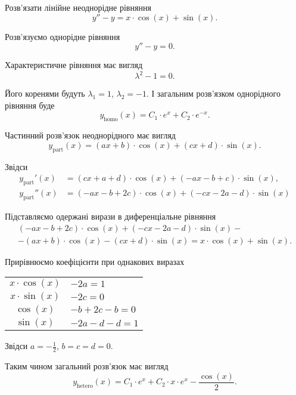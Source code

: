 \begin{example}
	Розв'язати лінійне неоднорідне рівняння \[ y'' - y = x \cdot \cos(x) + \sin (x).\]
\end{example}
\begin{solution}
	Розв'язуємо однорідне рівняння
	\begin{equation*}
		y'' - y = 0.
	\end{equation*}

	Характеристичне рівняння має вигляд
	\begin{equation*}
		\lambda^2 - 1 = 0.
	\end{equation*}

	Його коренями будуть $\lambda_1 = 1$, $\lambda_2 = -1$. І загальним роз\-в'яз\-ком однорідного рівняння буде
	\begin{equation*}
		y_{\text{homo}}(x) = C_1 \cdot e^x + C_2 \cdot e^{-x}.
	\end{equation*}

	Частинний розв'язок неоднорідного має вигляд
	\begin{equation*}
		y_{\text{part}}(x) = (a x + b) \cdot \cos (x) + (c x + d) \cdot \sin(x).
	\end{equation*}

	Звідси
	\begin{align*}
		y_{\text{part}}'(x) &= (c x + a + d) \cdot \cos (x) + (-a x - b + c) \cdot \sin(x), \\
		y_{\text{part}}''(x) &= (-a x - b + 2 c) \cdot \cos (x) + (- c x - 2 a - d) \cdot \sin(x)
	\end{align*}

	Підставляємо одержані вирази в диференціальне рівняння
	\begin{multline*}
		(-a x - b + 2 c) \cdot \cos (x) + (- c x - 2 a - d) \cdot \sin(x) - \\
		- (a x + b) \cdot \cos (x) - (c x + d) \cdot \sin(x) = x \cdot \cos(x) + \sin (x).
	\end{multline*}
		 
	Прирівнюємо коефіцієнти при однакових виразах
	\begin{table}[H]
		\centering
		\begin{tabular}{c|l}
			$x \cdot \cos (x)$ & $- 2 a = 1$ \\
			$x \cdot \sin (x)$ & $- 2 c = 0$ \\
			$\cos (x)$ & $- b + 2c - b = 0$ \\
			$\sin (x)$ & $- 2 a - d - d = 1$
		\end{tabular}
	\end{table}

	Звідси $a = - \frac12$, $b = c = d = 0$. \parvskip

	Таким чином загальний розв'язок має вигляд
	\begin{equation*}
		y_{\text{hetero}}(x) = C_1 \cdot e^x + C_2 \cdot x \cdot e^{x} - \frac{\cos (x)}{2}.
	\end{equation*}
\end{solution}

